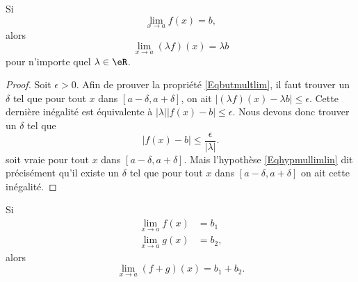 \begin{theorem}     \label{ThoLimLinMul}
	Si
	\begin{equation} \label{Eqhypmullimlin}
		\lim_{x\to a}f(x)=b,
	\end{equation}
	alors
	\begin{equation} \label{Eqbutmultlim}
		\lim_{x\to a}(\lambda f)(x)=\lambda b
	\end{equation}
	pour n'importe quel $\lambda\in\eR$.
\end{theorem}

\begin{proof}
	Soit $\epsilon>0$. Afin de prouver la propriété \eqref{Eqbutmultlim}, il faut trouver un $\delta$ tel que pour tout $x$ dans $[a-\delta,a+\delta]$, on ait $| (\lambda f)(x)- \lambda b |\leq\epsilon$. Cette dernière inégalité est équivalente à $|\lambda|| f(x)-b |\leq\epsilon$. Nous devons donc trouver un $\delta$ tel que
	\begin{equation}
		| f(x)-b |\leq\frac{ \epsilon }{ | \lambda | }.
	\end{equation}
	soit vraie pour tout $x$ dans $[a-\delta,a+\delta]$. Mais l'hypothèse \eqref{Eqhypmullimlin} dit précisément qu'il existe un $\delta$ tel que pour tout $x$ dans $[a-\delta,a+\delta]$ on ait cette inégalité.
\end{proof}

\begin{theorem}     \label{ThoLimLin}
	Si
	\begin{subequations}
		\begin{align}
			\lim_{x\to a}f(x) & =b_1  \\
			\lim_{x\to a}g(x) & =b_2,
		\end{align}
	\end{subequations}
	alors
	\begin{equation}
		\lim_{x\to a}(f+g)(x)=b_1+b_2.
	\end{equation}
\end{theorem}

